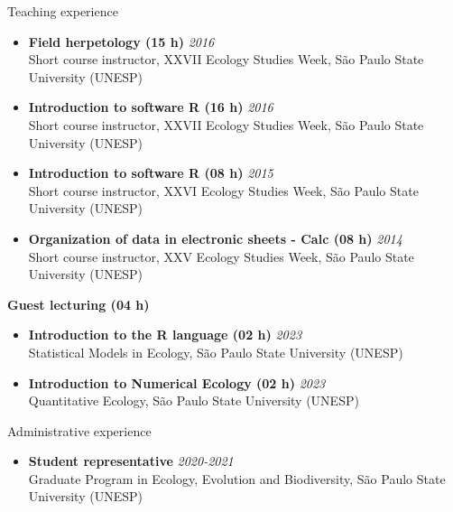 \documentclass{resume}
\begin{document}
\begin{rSection}{Teaching experience}
\begin{itemize}
\item {\bf Field herpetology (15 h)} \hfill{\em 2016} 
\\ Short course instructor, XXVII Ecology Studies Week, São Paulo State University (UNESP) 

\item {\bf Introduction to software R (16 h)} \hfill{\em 2016} 
\\ Short course instructor, XXVII Ecology Studies Week, São Paulo State University (UNESP) 

\item {\bf Introduction to software R (08 h)} \hfill{\em 2015} 
\\ Short course instructor, XXVI Ecology Studies Week, São Paulo State University (UNESP) 

\item {\bf Organization of data in electronic sheets - Calc (08 h)} \hfill{\em 2014} 
\\ Short course instructor, XXV Ecology Studies Week, São Paulo State University (UNESP) 
\end{itemize}

{\bf Guest lecturing (04 h)}
\begin{itemize}
\item {\bf Introduction to the R language (02 h)} \hfill{\em 2023} 
\\ Statistical Models in Ecology, São Paulo State University (UNESP) 

\item {\bf Introduction to Numerical Ecology (02 h)} \hfill{\em 2023} 
\\ Quantitative Ecology, São Paulo State University (UNESP) 
\end{itemize}
\end{rSection}


\begin{rSection}{Administrative experience}
\begin{itemize}
\item {\bf Student representative} \hfill{\em 2020-2021} \\ 
Graduate Program in Ecology, Evolution and Biodiversity, São Paulo State University (UNESP)
\end{itemize}
\end{rSection}
\end{document}
